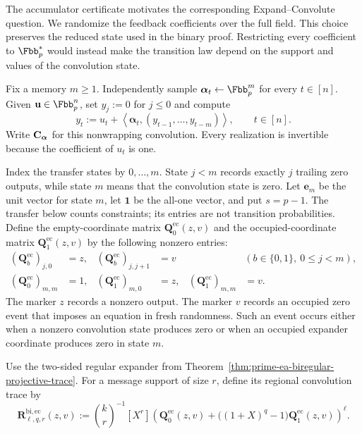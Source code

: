 The accumulator certificate motivates the corresponding Expand--Convolute
question.  We randomize the feedback coefficients over the full field.  This
choice preserves the reduced state used in the binary proof.  Restricting
every coefficient to $\Fbb_p^*$ would instead make the transition law depend
on the support and values of the convolution state.

Fix a memory $m\geq1$.  Independently sample
$\boldsymbol\alpha_t\gets\Fbb_p^m$ for every $t\in[n]$.  Given
$\mathbf u\in\Fbb_p^n$, set $y_j:=0$ for $j\leq0$ and compute
\begin{equation}
 y_t:=u_t+\left\langle\boldsymbol\alpha_t,
       (y_{t-1},\ldots,y_{t-m})\right\rangle,
 \qquad t\in[n].
 \label{eq:prime-ec-recurrence}
\end{equation}
Write $\mathbf C_{\boldsymbol\alpha}$ for this nonwrapping convolution.  Every
realization is invertible because the coefficient of $u_t$ is one.

Index the transfer states by $0,\ldots,m$.  State $j<m$ records exactly $j$
trailing zero outputs, while state $m$ means that the convolution state is
zero.  Let $\mathbf e_m$ be the unit vector for state $m$, let
$\boldsymbol 1$ be the all-one vector, and put $s=p-1$.  The transfer below
counts constraints; its entries are not transition probabilities.  Define
the empty-coordinate matrix $\mathbf Q^{\mathrm{ec}}_0(z,v)$ and the
occupied-coordinate matrix $\mathbf Q^{\mathrm{ec}}_1(z,v)$ by the following
nonzero entries:
\begin{align}
 (\mathbf Q^{\mathrm{ec}}_b)_{j,0}
   &=z,
 &
 (\mathbf Q^{\mathrm{ec}}_b)_{j,j+1}
   &=v
 &&(b\in\{0,1\},\ 0\leq j<m),
 \label{eq:prime-ec-active-constraint-trace}\\
 (\mathbf Q^{\mathrm{ec}}_0)_{m,m}&=1,
 &
 (\mathbf Q^{\mathrm{ec}}_1)_{m,0}&=z,
 &
 (\mathbf Q^{\mathrm{ec}}_1)_{m,m}&=v.
 \label{eq:prime-ec-zero-constraint-trace}
\end{align}
The marker $z$ records a nonzero output.  The marker $v$ records an occupied
zero event that imposes an equation in fresh randomness.  Such an event
occurs either when a nonzero convolution state produces zero or when an
occupied expander coordinate produces zero in state $m$.

Use the two-sided regular expander from
Theorem~\ref{thm:prime-ea-biregular-projective-trace}.  For a message support
of size $r$, define its regional convolution trace by
\begin{equation}
 \mathbf R^{\mathrm{bi,ec}}_{\ell,q,r}(z,v)
 :=\binom{k}{r}^{-1}[X^r]
 \left(
 \mathbf Q^{\mathrm{ec}}_0(z,v)
  +\bigl((1+X)^q-1\bigr)\mathbf Q^{\mathrm{ec}}_1(z,v)
 \right)^\ell.
 \label{eq:prime-ec-biregular-region}
\end{equation}

